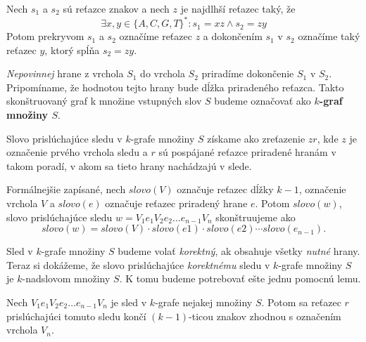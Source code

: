 \begin{defn}
Nech $s_1$ a $s_2$ sú reťazce znakov a nech $z$ je najdlhší reťazec taký, že
$$\exists x, y \in \{A, C, G, T\}^*: s_1 = xz \wedge s_2 = zy$$
Potom prekryvom $s_1$ a $s_2$ označíme reťazec $z$ a dokončením $s_1$ v $s_2$ označíme
taký reťazec $y$, ktorý spĺňa $s_2 = zy$.
\end{defn}

\emph{Nepovinnej} hrane z vrchola $S_1$ do vrchola $S_2$ priradíme dokončenie $S_1$ v
$S_2$. Pripomíname, že hodnotou tejto hrany bude dĺžka priradeného reťazca.
Takto skonštruovaný graf k množine vstupných slov $S$ budeme označovať ako
\textbf{\boldmath$k$-graf množiny \boldmath$S$}.

Slovo prislúchajúce sledu v $k$-grafe množiny $S$ získame ako zreťazenie $zr$, kde $z$ je
označenie prvého vrchola sledu a $r$ sú pospájané reťazce priradené hranám v takom
poradí, v akom sa tieto hrany nachádzajú v slede.

Formálnejšie zapísané, nech $slovo(V)$ označuje reťazec dĺžky $k-1$, označenie vrchola
$V$ a $slovo(e)$ označuje reťazec priradený hrane $e$. Potom $slovo(w)$, slovo
prislúchajúce sledu $w = V_1 e_1 V_2 e_2 \ldots e_{n-1} V_n$ skonštruujeme
ako 
$$slovo(w) = slovo(V) \cdot slovo(e1) \cdot slovo(e2) \cdots slovo(e_{n-1}).$$

Sled v $k$-grafe množiny $S$ budeme volať \emph{korektný}, ak obsahuje všetky \emph{nutné} hrany.
Teraz si dokážeme, že slovo prislúchajúce \emph{korektnému} sledu v $k$-grafe množiny $S$ je
$k$-nadslovom množiny $S$. K tomu budeme potrebovať ešte jednu pomocnú lemu.

\begin{lema}
    Nech $V_1 e_1 V_2 e_2 \ldots e_{n-1} V_n$ je sled v $k$-grafe nejakej množiny $S$.
    Potom sa reťazec $r$ prislúchajúci tomuto sledu končí $(k-1)$-ticou znakov zhodnou
    s označením vrchola $V_n$.
\end{lema}

